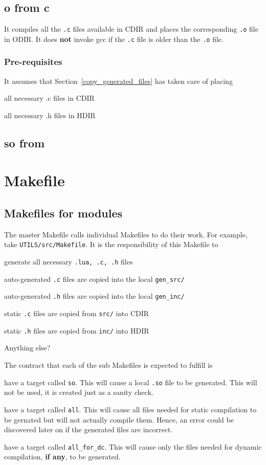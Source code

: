\subsection{o from c}
\label{o_from_c}

It compiles all the {\tt .c} files available in CDIR and places 
the corresponding {\tt .o} file in ODIR. It does {\bf not} invoke gcc if the {\tt.c}
file is older than the {\tt .o} file. 


\subsubsection{Pre-requisites}
It assumes that Section~\ref{copy_generated_files} has taken care of placing
\be
\item all necessary .c files in CDIR
\item all necessary .h files in HDIR
\ee

\subsection{so from}
\label{so_from_o}
\TBC

\section{Makefile}

\subsection{Makefiles for modules}
The master Makefile calls individual Makefiles to do their work. For example,
take \verb+UTILS/src/Makefile+. It is the responsibility of this Makefile to
\be
\item generate all necessary {\tt .lua, .c, .h} files
\item auto-generated {\tt .c} files are copied into the local \verb+gen_src/+ 
\item auto-generated {\tt .h} files are copied into the local \verb+gen_inc/+ 

\item static {\tt .c} files are copied from {\tt src/} into CDIR
\item static {\tt .h} files are copied from {\tt inc/} into HDIR
\item Anything else? \TBC
\ee

The contract that each of the sub Makefiles is expected to fulfill is
\be
\item 
have a target called {\tt so}. This will cause a local \verb+.so+ file 
to be generated. This will not be used, it is created just as a 
sanity check.
\item have a target called {\tt all}. This will cause all files needed for
static compilation to be gernated but will not actually compile them. Hence, an
error could be discovered later on if the generated files are incorrect.
\item have a target called {\tt all\_for\_dc}. This will cause only the files needed for
dynamic compilation, {\bf if any}, to be generated.


